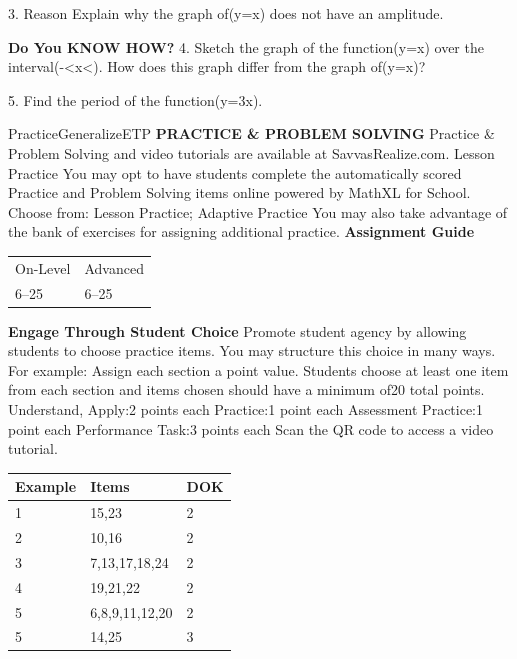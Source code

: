 \documentclass{article}
\newenvironment{item-analysis}{}{}      %
\newenvironment{concept-summary}{}{}    %
\newenvironment{te-addendum}[2]{}{}     %
\newcommand{\answer}[1]{}               %
\newcommand{\placeholder}[2]{}          %
\begin{document}
\begin{concept-summary}
\answer{The period of the tangent function is(pi). Mia could have thought since both the sine and the cosine function have a period of(2\pi) and since(\tan x=\frac{\sin x}{\cos x}), then the tangent function should have a period of(2\pi).}
3. Reason Explain why the graph of(y=\tan x) does not have an amplitude.
\answer{The graph of(y=\tan x) does not have a maximum or minimum value.}
\textbf{Do You KNOW HOW?}
4. Sketch the graph of the function(y=\tan x) over the interval(-\frac{}<x<\frac{}). How does this graph differ from the graph of(y=\tan x)?
\answer{The coefficient compresses the graph vertically by a factor of(1/2).}
\placeholder{graph}{Red(1/2)tan x on arrowed x,y axes,O;xgridpi/4 labelspi/2,pi,3pi/2;ygrid1 labels-4,-2,2,4;window-pi/2..2pi,-5..5. Rising branches through0,pi,2pi,asymptotes oddpi/2 notdrawn;end arrows. Printed graph extends beyond requested interval.}
5. Find the period of the function(y=\tan3x).
\answer{(\pi/3)}
\end{concept-summary}
\begin{te-addendum}{Practice}{GeneralizeETP}
\textbf{PRACTICE \& PROBLEM SOLVING}
Practice \& Problem Solving and video tutorials are available at SavvasRealize.com.
Lesson Practice You may opt to have students complete the automatically scored Practice and Problem Solving items online powered by MathXL for School.
Choose from: Lesson Practice; Adaptive Practice
You may also take advantage of the bank of exercises for assigning additional practice.
\textbf{Assignment Guide}
\begin{tabular}{ll}
On-Level & Advanced \\
6--25 & 6--25 \\
\end{tabular}
\textbf{Engage Through Student Choice}
Promote student agency by allowing students to choose practice items. You may structure this choice in many ways. For example:
Assign each section a point value. Students choose at least one item from each section and items chosen should have a minimum of20 total points.
Understand, Apply:2 points each
Practice:1 point each
Assessment Practice:1 point each
Performance Task:3 points each
Scan the QR code to access a video tutorial.
\end{te-addendum}
\begin{item-analysis}
\begin{tabular}{lll}
\toprule
Example & Items & DOK \\
\midrule
1 & 15,23 & 2 \\
2 & 10,16 & 2 \\
3 & 7,13,17,18,24 & 2 \\
4 & 19,21,22 & 2 \\
5 & 6,8,9,11,12,20 & 2 \\
5 & 14,25 & 3 \\
\bottomrule
\end{tabular}
\end{item-analysis}
\end{document}
